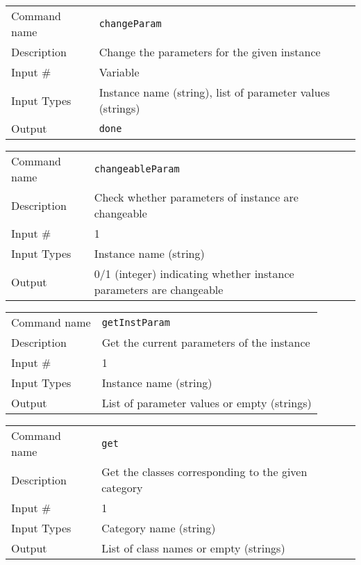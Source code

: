 \bigskip

\noindent
\begin{tabular}{l|p{5in}}
\hline
Command name & {\tt changeParam} \\
Description  & Change the parameters for the given instance \\
Input \#     & Variable \\
Input Types  & Instance name (string), list of parameter values (strings) \\
Output       & {\tt done} \\
\hline
\end{tabular}

\bigskip

\noindent
\begin{tabular}{l|p{5in}}
\hline
Command name & {\tt changeableParam} \\
Description  & Check whether parameters of instance are changeable \\
Input \#     & 1 \\
Input Types  & Instance name (string) \\
Output       & 0/1 (integer) indicating whether instance parameters are
               changeable \\
\hline
\end{tabular}

\bigskip

\noindent
\begin{tabular}{l|p{5in}}
\hline
Command name & {\tt getInstParam} \\
Description  & Get the current parameters of the instance \\
Input \#     & 1 \\
Input Types  & Instance name (string) \\
Output       & List of parameter values or empty (strings) \\
\hline
\end{tabular}

\bigskip

\noindent
\begin{tabular}{l|p{5in}}
\hline
Command name & {\tt get} \\
Description  & Get the classes corresponding to the given category \\
Input \#     & 1 \\
Input Types  & Category name (string) \\
Output       & List of class names or empty (strings) \\
\hline
\end{tabular}


